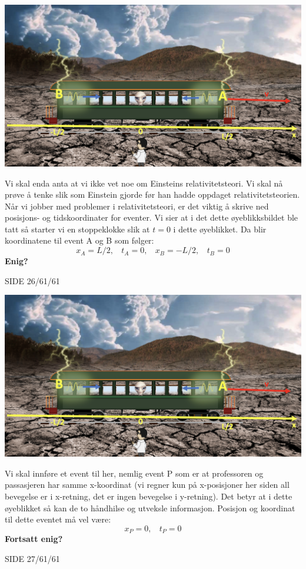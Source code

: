 \documentclass{beamer}
\begin{document}
\begin{frame}
{
  \footnotesize
\centerline{\includegraphics[scale=0.26]{media/tog1.png}}
Vi skal enda anta at vi ikke vet noe om Einsteins relativitetsteori. Vi skal nå prøve å tenke slik som Einstein gjorde før han hadde oppdaget relativitetsteorien. Når vi jobber med problemer i relativitetsteori, er det viktig å skrive ned posisjons- og tidskoordinater for eventer. Vi sier at i det dette øyeblikksbildet ble tatt så starter vi en stoppeklokke slik at $t=0$ i dette øyeblikket. Da blir koordinatene til event A og B som følger:
\[
x_A=L/2,\ \ \ \ t_A=0, \ \ \ \ x_B=-L/2,\ \ \ \ t_B=0
\]
{\bf Enig?}
}{SIDE 26/61/61}

{
  \footnotesize
\centerline{\includegraphics[scale=0.26]{media/tog1.png}}
Vi skal innføre et event til her, nemlig event P som er at professoren og passasjeren har samme x-koordinat (vi regner kun på x-posisjoner her siden all bevegelse er i x-retning, det er ingen bevegelse i y-retning). Det betyr at i dette øyeblikket så kan de to håndhilse og utveksle informasjon. Posisjon og koordinat til dette eventet må vel være:
\[
x_P=0,\ \ \ \ t_P=0
\]
{\bf Fortsatt enig?}
}{SIDE 27/61/61}


\end{frame}
\end{document}
